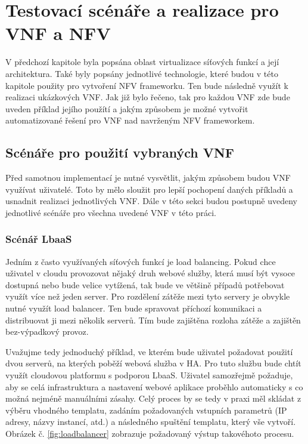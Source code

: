 \chapter{Testovací scénáře a realizace pro VNF a NFV}

V předchozí kapitole byla popsána oblast virtualizace síťových funkcí a její architektura. Také byly popsány jednotlivé technologie, které budou v této kapitole použity pro vytvoření NFV frameworku. Ten bude následně využít k realizaci ukázkových VNF. Jak již bylo řečeno, tak pro každou VNF zde bude uveden příklad jejího použítí a jakým způsobem je možné vytvořit automatizované řešení pro VNF nad navrženým NFV frameworkem.

\section{Scénáře pro použití vybraných VNF}

Před samotnou implementací je nutné vysvětlit, jakým způsobem budou VNF využívat uživatelé. Toto by mělo sloužit pro lepší pochopení daných příkladů a usnadnit realizaci jednotlivých VNF. Dále v této sekci budou postupně uvedeny jednotlivé scénáře pro všechna uvedené VNF v této práci. 

\subsection{Scénář LbaaS}

Jedním z často využívaných síťových funkcí je load balancing. Pokud chce uživatel v cloudu provozovat nějaký druh webové služby, která musí být vysoce dostupná nebo bude velice vytížená, tak bude ve většině případů potřebovat využít více než jeden server. Pro rozdělení zátěže mezi tyto servery je obvykle nutné využít load balancer. Ten bude spravovat příchozí komunikaci a distribuovat ji mezi několik serverů. Tím bude zajištěna rozloha zátěže a zajištěn bez-výpadkový provoz.

Uvažujme tedy jednoduchý příklad, ve kterém bude uživatel požadovat použití dvou serverů, na kterých poběží webová služba v HA. Pro tuto službu bude chtít využít cloudovou platformu s podporou LbaaS. Uživatel samozřejmě požaduje, aby se celá infrastruktura a nastavení webové aplikace proběhlo automaticky s co možná nejméně manuálními zásahy. Celý proces by se tedy v praxi měl skládat z výběru vhodného templatu, zadáním požadovaných vstupních parametrů (IP adresy, názvy instancí, atd.) a následného spuštění templatu, který vše vytvoří. Obrázek č. \ref{fig:loadbalancer} zobrazuje požadovaný výstup takovéhoto procesu.

